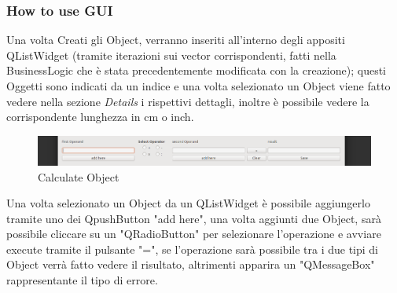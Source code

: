 \documentclass[10pt]{beamer}
\begin{document}

\begin{frame} %
\frametitle{How to use GUI}
Una volta Creati gli Object, verranno inseriti all'interno degli appositi QListWidget (tramite iterazioni sui vector corrispondenti, fatti nella BusinessLogic che è stata precedentemente modificata con la creazione); questi Oggetti sono indicati da un indice e una volta selezionato un Object viene fatto vedere nella sezione \textit{Details} i rispettivi dettagli, inoltre è possibile vedere la corrispondente lunghezza in cm o inch.

   \FloatBarrier
   \begin{figure}[ht]
   \centering
   \includegraphics[scale=0.10]{Calcolo.png}
   \caption{Calculate Object}
\end{figure}

Una volta selezionato un Object da un QListWidget è possibile aggiungerlo tramite uno dei QpushButton "add here", una volta aggiunti due Object, sarà possibile cliccare su un "QRadioButton" per selezionare l'operazione e avviare execute tramite il pulsante "=", se l'operazione sarà possibile tra i due tipi di Object verrà fatto vedere il risultato, altrimenti apparira un "QMessageBox" rappresentante il tipo di errore.



\end{frame}

\end{document}
